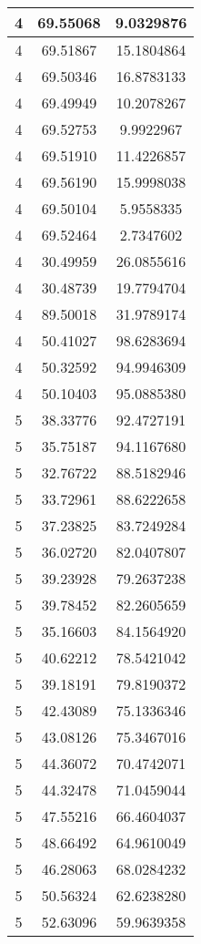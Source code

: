 \documentclass[
]{book}
\begin{document}
\begin{tabular}{c|c|c}
\hline
4 & 69.55068 & 9.0329876\\
\hline
4 & 69.51867 & 15.1804864\\
\hline
4 & 69.50346 & 16.8783133\\
\hline
4 & 69.49949 & 10.2078267\\
\hline
4 & 69.52753 & 9.9922967\\
\hline
4 & 69.51910 & 11.4226857\\
\hline
4 & 69.56190 & 15.9998038\\
\hline
4 & 69.50104 & 5.9558335\\
\hline
4 & 69.52464 & 2.7347602\\
\hline
4 & 30.49959 & 26.0855616\\
\hline
4 & 30.48739 & 19.7794704\\
\hline
4 & 89.50018 & 31.9789174\\
\hline
4 & 50.41027 & 98.6283694\\
\hline
4 & 50.32592 & 94.9946309\\
\hline
4 & 50.10403 & 95.0885380\\
\hline
5 & 38.33776 & 92.4727191\\
\hline
5 & 35.75187 & 94.1167680\\
\hline
5 & 32.76722 & 88.5182946\\
\hline
5 & 33.72961 & 88.6222658\\
\hline
5 & 37.23825 & 83.7249284\\
\hline
5 & 36.02720 & 82.0407807\\
\hline
5 & 39.23928 & 79.2637238\\
\hline
5 & 39.78452 & 82.2605659\\
\hline
5 & 35.16603 & 84.1564920\\
\hline
5 & 40.62212 & 78.5421042\\
\hline
5 & 39.18191 & 79.8190372\\
\hline
5 & 42.43089 & 75.1336346\\
\hline
5 & 43.08126 & 75.3467016\\
\hline
5 & 44.36072 & 70.4742071\\
\hline
5 & 44.32478 & 71.0459044\\
\hline
5 & 47.55216 & 66.4604037\\
\hline
5 & 48.66492 & 64.9610049\\
\hline
5 & 46.28063 & 68.0284232\\
\hline
5 & 50.56324 & 62.6238280\\
\hline
5 & 52.63096 & 59.9639358\\

\end{tabular}
\end{document}
